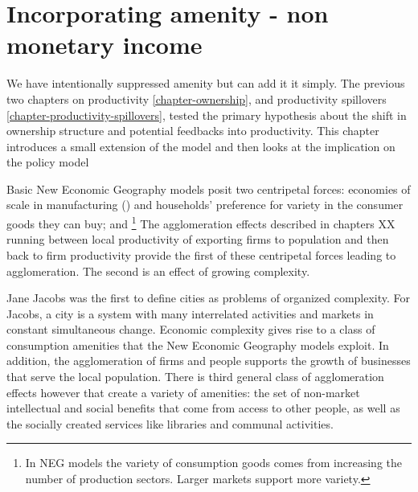 \chapter[Amenity]{Incorporating amenity - non monetary income}\label{chapter-amenity}

We have intentionally suppressed amenity but can add it it simply.
The previous two chapters on productivity \ref{chapter-ownership}, and productivity spillovers \ref{chapter-productivity-spillovers}, tested the primary hypothesis about the shift in ownership structure and potential feedbacks into productivity. This chapter introduces a small extension of the model and then looks at the implication on the policy model



Basic New Economic Geography models posit two centripetal forces: economies of scale in manufacturing (\cite{gurwitzCatastrophicAgglomeration2019}) and households' preference for variety in the consumer goods they can buy; and \footnote{In NEG models the variety of consumption goods comes from increasing the number of  production sectors. Larger markets support more variety.} The agglomeration effects described in chapters XX  running between local productivity  of exporting firms to population and then back to firm productivity provide the first of these centripetal forces leading to agglomeration. The second is an effect of growing complexity. 

Jane Jacobs was the first to define cities as problems of organized complexity. For Jacobs, a city is a system with many interrelated activities and markets in constant simultaneous change. Economic complexity gives rise to a class of consumption amenities that the New Economic Geography models exploit. In addition, the agglomeration of firms and people supports the growth of businesses that serve the local population. There is third general class of agglomeration effects however that  create a variety of amenities: the set of non-market intellectual and social benefits that come from access to other people, as well as the socially created services like libraries and communal activities.  

